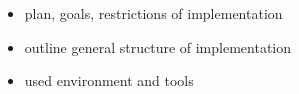 \begin{itemize}
	\item{plan, goals, restrictions of implementation}
	\item{outline general structure of implementation}
	\item{used environment and tools}
\end{itemize}